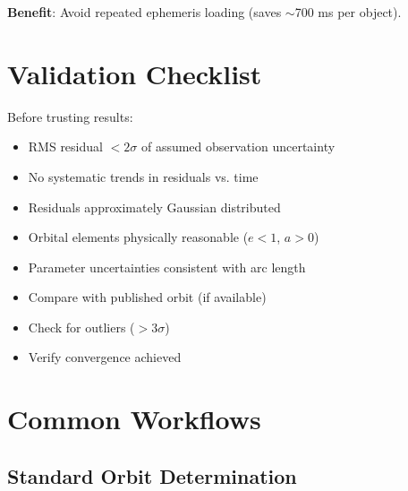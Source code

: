 \textbf{Benefit}: Avoid repeated ephemeris loading (saves $\sim$700 ms per object).

\section{Validation Checklist}

Before trusting results:

\begin{itemize}
    \item[$\square$] RMS residual $< 2\sigma$ of assumed observation uncertainty
    \item[$\square$] No systematic trends in residuals vs. time
    \item[$\square$] Residuals approximately Gaussian distributed
    \item[$\square$] Orbital elements physically reasonable ($e < 1$, $a > 0$)
    \item[$\square$] Parameter uncertainties consistent with arc length
    \item[$\square$] Compare with published orbit (if available)
    \item[$\square$] Check for outliers ($> 3\sigma$)
    \item[$\square$] Verify convergence achieved
\end{itemize}

\section{Common Workflows}

\subsection{Standard Orbit Determination}

